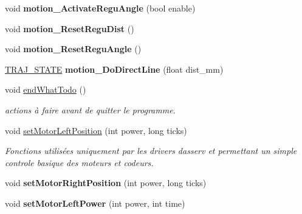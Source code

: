 \begin{DoxyCompactItemize}
\mbox{\label{classAsservDriver_a846608b8033f7d592d2540b68de72eeb}} 
void {\bfseries motion\+\_\+\+Activate\+Regu\+Angle} (bool enable)
\item 
\mbox{\label{classAsservDriver_acb84d282c7e0b40d9b326b0fcb7a0c69}} 
void {\bfseries motion\+\_\+\+Reset\+Regu\+Dist} ()
\item 
\mbox{\label{classAsservDriver_acd102376cacdf0fc40a587f25359a25e}} 
void {\bfseries motion\+\_\+\+Reset\+Regu\+Angle} ()
\item 
\mbox{\label{classAsservDriver_a9d967bff5061c791226484bbd998362b}} 
\hyperlink{path__manager_8h_adb3360abeb29758da93865c8afcb80eb}{T\+R\+A\+J\+\_\+\+S\+T\+A\+TE} {\bfseries motion\+\_\+\+Do\+Direct\+Line} (float dist\+\_\+mm)
\item 
\mbox{\label{classAsservDriver_a636bf5413d2cf0419f188a4965340758}} 
void \hyperlink{classAsservDriver_a636bf5413d2cf0419f188a4965340758}{end\+What\+Todo} ()
\begin{DoxyCompactList}\small\item\em actions à faire avant de quitter le programme. \end{DoxyCompactList}\item 
\mbox{\label{classAsservDriver_a49dad05da23fe62aa4bf582199eaa3a6}} 
void \hyperlink{classAsservDriver_a49dad05da23fe62aa4bf582199eaa3a6}{set\+Motor\+Left\+Position} (int power, long ticks)
\begin{DoxyCompactList}\small\item\em Fonctions utilisées uniquement par les drivers d\textquotesingle{}asserv et permettant un simple controle basique des moteurs et codeurs. \end{DoxyCompactList}\item 
\mbox{\label{classAsservDriver_a62a57e92e4933413d9c3c6b62f496ef3}} 
void {\bfseries set\+Motor\+Right\+Position} (int power, long ticks)
\item 
\mbox{\label{classAsservDriver_a3b702233fa09a657bb03372470152376}} 
void {\bfseries set\+Motor\+Left\+Power} (int power, int time)

\end{DoxyCompactItemize}
